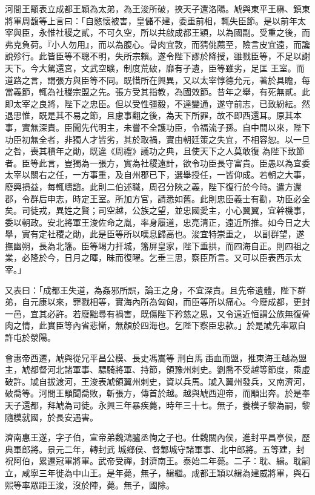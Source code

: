 \begin{pinyinscope}
 河間王顒表立成都王穎為太弟，為王浚所破，挾天子還洛陽。虓與東平王楙、鎮東將軍周馥等上言曰：「自愍懷被害，皇儲不建，委重前相，輒失臣節。是以前年太宰與臣，永惟社稷之貳，不可久空，所以共啟成都王穎，以為國副。受重之後，而弗克負荷。『小人勿用』，而以為腹心。骨肉宜敦，而猜佻薦至，險言皮宜遠，而讒說殄行。此皆臣等不聰不明，失所宗賴。遂令陛下謬於降授，雖戮臣等，不足以謝天下。今大駕還宮，文武空曠，制度荒破，靡有孑遺，臣等雖劣，足匡
 王室。而道路之言，謂張方與臣等不同。既惜所在興異，又以太宰惇德允元，著於具瞻，每當義節，輒為社稷宗盟之先。張方受其指教，為國效節。昔年之舉，有死無貳。此即太宰之良將，陛下之忠臣。但以受性彊毅，不達變通，遂守前志，已致紛紜。然退思惟，既是其不易之節，且慮事翻之後，為天下所罪，故不即西還耳。原其本事，實無深責。臣聞先代明主，未嘗不全護功臣，令福流子孫。自中間以來，陛下功臣初無全者，非獨人才皆劣，其於取禍，實由朝廷策之失宜，不相容恕。以一旦之咎，喪其積年之勛，既違《周禮》議功之典，且使天下之人莫敢復
 為陛下致節者。臣等此言，豈獨為一張方，實為社稷遠計，欲令功臣長守富貴。臣愚以為宜委太宰以關右之任，一方事重，及自州郡已下，選舉授任，一皆仰成。若朝之大事，廢興損益，每輒疇諮。此則二伯述職，周召分陜之義，陛下復行於今時。遣方還郡，令群后申志，時定王室。所加方官，請悉如舊。此則忠臣義士有勸，功臣必全矣。司徒戎，異姓之賢；司空越，公族之望，並忠國愛主，小心翼翼，宜幹機事，委以朝政。安北將軍王浚佐命之胤，率身履道，忠亮清正，遠近所推。如今日之大舉，實有定社稷之勛，此是臣等所以嘆息歸高也。浚宜特崇重之，
 以副群望，遂撫幽朔，長為北籓。臣等竭力扞城，籓屏皇家，陛下垂拱，而四海自正。則四祖之業，必隆於今，日月之暉，昧而復曜。乞垂三思，察臣所言。又可以臣表西示太宰。」



 又表曰：「成都王失道，為姦邪所誤，論王之身，不宜深責。且先帝遺體，陛下群弟，自元康以來，罪戮相等，實海內所為匈匈，而臣等所以痛心。今廢成都，更封一邑，宜其必許。若廢黜尋有禍害，既傷陛下矜慈之恩，又令遠近恒謂公族無復骨肉之情，此實臣等內省悲慚，無顏於四海也。乞陛下察臣忠款。」於是虓先率眾自許屯於滎陽。



 會惠帝西遷，虓與從兄平昌公模、長史馮嵩等
 刑白馬臿血而盟，推東海王越為盟主，虓都督河北諸軍事、驃騎將軍、持節，領豫州刺史。劉喬不受越等節度，乘虛破許。虓自拔渡河，王浚表虓領翼州刺史，資以兵馬。虓入翼州發兵，又南濟河，破喬等。河間王顒聞喬敗，斬張方，傳首於越。越與虓西迎帝，而顒出奔。於是奉天子還都，拜虓為司徒。永興三年暴疾薨，時年三十七。無子，養模子黎為嗣，黎隨模就國，於長安遇害。



 濟南惠王遂，字子伯，宣帝弟魏鴻臚丞恂之子也。仕魏關內侯，進封平昌亭侯，歷典軍郎將。景元二年，轉封武
 城鄉侯、督鄴城守諸軍事、北中郎將。五等建，封祝阿伯，累遷冠軍將軍。武帝受禪，封濟南王。泰始二年薨。二子：耽、緝。耽嗣立，咸寧三年徙為中山王。是年薨，無子，緝繼。成都王穎以緝為建威將軍，與石熙等率眾距王浚，沒於陣，薨。無子，國除。




\end{pinyinscope}

